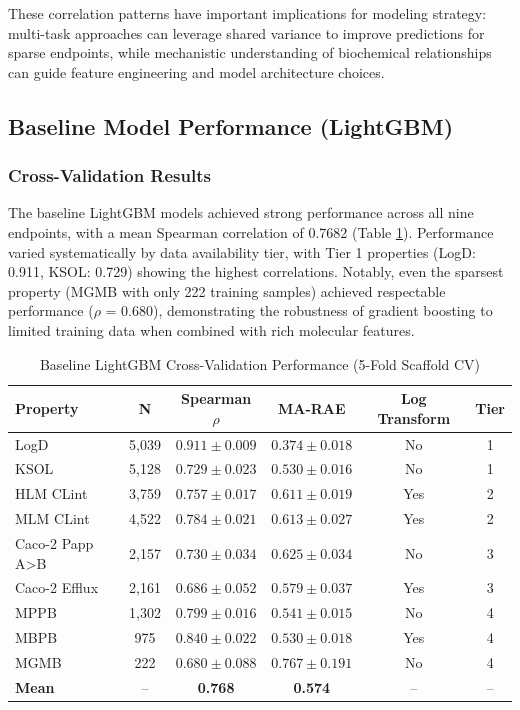 \documentclass[11pt,a4paper]{article}
\begin{document}
These correlation patterns have important implications for modeling strategy: multi-task approaches can leverage shared variance to improve predictions for sparse endpoints, while mechanistic understanding of biochemical relationships can guide feature engineering and model architecture choices.

\subsection{Baseline Model Performance (LightGBM)}

\subsubsection{Cross-Validation Results}

The baseline LightGBM models achieved strong performance across all nine endpoints, with a mean Spearman correlation of 0.7682 (Table \ref{tab:baseline_cv}). Performance varied systematically by data availability tier, with Tier 1 properties (LogD: 0.911, KSOL: 0.729) showing the highest correlations. Notably, even the sparsest property (MGMB with only 222 training samples) achieved respectable performance ($\rho$ = 0.680), demonstrating the robustness of gradient boosting to limited training data when combined with rich molecular features.

\begin{table}[h]
\centering
\caption{Baseline LightGBM Cross-Validation Performance (5-Fold Scaffold CV)}
\label{tab:baseline_cv}
\small
\begin{tabular}{lccccc}
\toprule
Property & N & Spearman $\rho$ & MA-RAE & Log Transform & Tier \\
\midrule
LogD & 5,039 & $0.911 \pm 0.009$ & $0.374 \pm 0.018$ & No & 1 \\
KSOL & 5,128 & $0.729 \pm 0.023$ & $0.530 \pm 0.016$ & No & 1 \\
HLM CLint & 3,759 & $0.757 \pm 0.017$ & $0.611 \pm 0.019$ & Yes & 2 \\
MLM CLint & 4,522 & $0.784 \pm 0.021$ & $0.613 \pm 0.027$ & Yes & 2 \\
Caco-2 Papp A>B & 2,157 & $0.730 \pm 0.034$ & $0.625 \pm 0.034$ & No & 3 \\
Caco-2 Efflux & 2,161 & $0.686 \pm 0.052$ & $0.579 \pm 0.037$ & Yes & 3 \\
MPPB & 1,302 & $0.799 \pm 0.016$ & $0.541 \pm 0.015$ & No & 4 \\
MBPB & 975 & $0.840 \pm 0.022$ & $0.530 \pm 0.018$ & Yes & 4 \\
MGMB & 222 & $0.680 \pm 0.088$ & $0.767 \pm 0.191$ & No & 4 \\
\midrule
\textbf{Mean} & -- & \textbf{0.768} & \textbf{0.574} & -- & -- \\
\bottomrule
\end{tabular}
\end{table}
\end{document}
